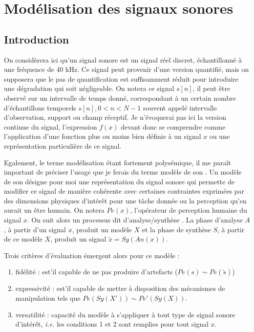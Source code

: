 \chapter{Modélisation des signaux sonores} \label{sec:modeles}

\section{Introduction}

On considèrera ici qu'un signal sonore est un signal réel discret, échantillonné à une fréquence de 40 kHz. Ce signal peut provenir d'une version quantifié, mais on supposera que le pas de quantification est suffisamment réduit pour introduire une dégradation qui soit négligeable. On notera ce signal $s[n]$, il peut être observé sur un intervalle de temps donné, correspondant à un certain nombre d'échantillons temporels $s[n], 0<n<N-1$ souvent appelé intervalle d'observation, support ou champ réceptif. Je n'évoquerai pas ici la version continue du signal, l'expression $f(x)$ devant donc se comprendre comme l'application d'une fonction plus ou moins bien définie à un signal $x$ ou une représentation particulière de ce signal.

Egalement, le terme modélisation étant fortement polysémique, il me paraît important de préciser l'usage que je ferais du terme \og modèle de son \fg. Un modèle de son désigne pour moi une représentation du signal sonore qui permette de modifier ce signal de manière cohérente avec certaines contraintes exprimées par des dimensions physiques d'intérêt pour une tâche donnée ou la perception qu'en aurait un être humain. On notera $Pe(x)$, l'opérateur de perception humaine du signal $x$. On suit alors un processus dit \og d'analyse/synthèse \fg. La phase d'analyse $A$, à partir d'un signal $x$, produit un modèle $X$ et la phase de synthèse $S$, à partir de ce modèle $X$, produit un signal $\tilde{x}=Sy(An(x))$.

Trois critères d'évaluation émergent alors pour ce modèle :
\begin{enumerate}
  \item fidélité : est'il capable de ne pas produire d'artefacts ($Pe(s) \sim Pe(\tilde{s})$)
  \item expressivité : est'il capable de mettre à disposition des mécanismes de manipulation tels que $Pe(Sy(X')) \sim Pe'(Sy(X))$.
  \item versatilité : capacité du modèle à s'appliquer à tout type de signal sonore d'intérêt, \textit{i.e.} les conditions 1 et 2 sont remplies pour tout signal $x$.
\end{enumerate}

